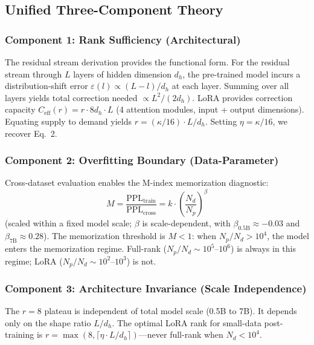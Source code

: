 \documentclass[11pt]{article}
\begin{document}
\subsection{Unified Three-Component Theory}

\subsubsection{Component 1: Rank Sufficiency (Architectural)}

The residual stream derivation provides the functional form. For the residual stream through $L$ layers of hidden dimension $d_h$, the pre-trained model incurs a distribution-shift error $\varepsilon(l) \propto (L-l)/d_h$ at each layer. Summing over all layers yields total correction needed $\propto L^2/(2d_h)$. LoRA provides correction capacity $C_{\text{eff}}(r) = r \cdot 8d_h \cdot L$ (4 attention modules, input + output dimensions). Equating supply to demand yields $r = (\kappa/16) \cdot L/d_h$. Setting $\eta = \kappa/16$, we recover Eq.~2.

\subsubsection{Component 2: Overfitting Boundary (Data-Parameter)}

Cross-dataset evaluation enables the M-index memorization diagnostic:
\begin{equation}
M = \frac{\text{PPL}_{\text{train}}}{\text{PPL}_{\text{cross}}} = k \cdot \left(\frac{N_d}{N_p}\right)^\beta
\end{equation}
(scaled within a fixed model scale; $\beta$ is scale-dependent, with $\beta_{0.5\text{B}} \approx -0.03$ and $\beta_{7\text{B}} \approx 0.28$). The memorization threshold is $M < 1$: when $N_p/N_d > 10^4$, the model enters the memorization regime. Full-rank ($N_p/N_d \sim 10^5$--$10^6$) is always in this regime; LoRA ($N_p/N_d \sim 10^2$--$10^3$) is not.

\subsubsection{Component 3: Architecture Invariance (Scale Independence)}

The $r=8$ plateau is independent of total model scale (0.5B to 7B). It depends only on the shape ratio $L/d_h$. The optimal LoRA rank for small-data post-training is $r = \max(8, \lceil \eta \cdot L/d_h \rceil)$---never full-rank when $N_d < 10^4$.
\end{document}
